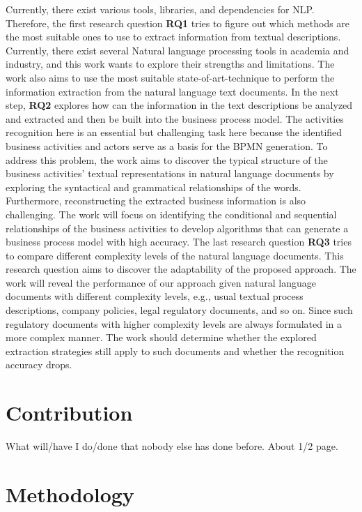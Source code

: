 	
	Currently, there exist various tools, libraries, and dependencies for NLP. Therefore, the first research question \textbf{RQ1} tries to figure out which methods are the most suitable ones to use to extract information from textual descriptions. Currently, there exist several Natural language processing tools in academia and industry, and this work wants to explore their strengths and limitations. The work also aims to use the most suitable state-of-art-technique to perform the information extraction from the natural language text documents. 
	In the next step, \textbf{RQ2} explores how can the information in the text descriptions be analyzed and extracted and then be built into the business process model. The activities recognition here is an essential but challenging task here because the identified business activities and actors serve as a basis for the BPMN generation. To address this problem, the work aims to discover the typical structure of the business activities' textual representations in natural language documents by exploring the syntactical and grammatical relationships of the words. Furthermore, reconstructing the extracted business information is also challenging. The work will focus on identifying the conditional and sequential relationships of the business activities to develop algorithms that can generate a business process model with high accuracy.
	The last research question \textbf{RQ3} tries to compare different complexity levels of the natural language documents. This research question aims to discover the adaptability of the proposed approach. The work will reveal the performance of our approach given natural language documents with different complexity levels, e.g., usual textual process descriptions, company policies, legal regulatory documents, and so on. Since such regulatory documents with higher complexity levels are always formulated in a more complex manner. The work should determine whether the explored extraction strategies still apply to such documents and whether the recognition accuracy drops. 


\section{Contribution}
\label{sec:intro:con}

What will/have I do/done that nobody else has done before. About 1/2 page.

\section{Methodology}
\label{sec:intro:meth}

